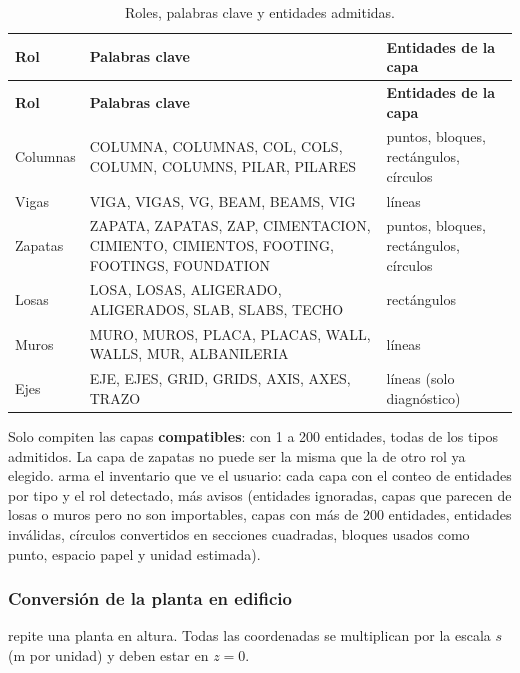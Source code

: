 \begin{longtable}{L{2.2cm}L{7cm}L{4.4cm}}
	\caption{Roles, palabras clave y entidades admitidas.} \label{tab:mod-dxf-roles} \\
	\hline
	\textbf{Rol} & \textbf{Palabras clave} & \textbf{Entidades de la capa} \\ \hline
	\endfirsthead
	\hline
	\textbf{Rol} & \textbf{Palabras clave} & \textbf{Entidades de la capa} \\ \hline
	\endhead
	\hline
	\endfoot
	Columnas & COLUMNA, COLUMNAS, COL, COLS, COLUMN, COLUMNS, PILAR, PILARES & puntos, bloques, rectángulos,
	círculos \\
	Vigas & VIGA, VIGAS, VG, BEAM, BEAMS, VIG & líneas \\
	Zapatas & ZAPATA, ZAPATAS, ZAP, CIMENTACION, CIMIENTO, CIMIENTOS, FOOTING, FOOTINGS, FOUNDATION & puntos, bloques,
	rectángulos, círculos \\
	Losas & LOSA, LOSAS, ALIGERADO, ALIGERADOS, SLAB, SLABS, TECHO & rectángulos \\
	Muros & MURO, MUROS, PLACA, PLACAS, WALL, WALLS, MUR, ALBANILERIA & líneas \\
	Ejes & EJE, EJES, GRID, GRIDS, AXIS, AXES, TRAZO & líneas (solo diagnóstico) \\
\end{longtable}

Solo compiten las capas \textbf{compatibles}: con 1 a 200 entidades, todas de los tipos admitidos. La capa de zapatas
no puede ser la misma que la de otro rol ya elegido.  arma el inventario que ve el
usuario: cada capa con el conteo de entidades por tipo y el rol detectado, más avisos (entidades ignoradas, capas que
parecen de losas o muros pero no son importables, capas con más de 200 entidades, entidades inválidas, círculos
convertidos en secciones cuadradas, bloques usados como punto, espacio papel y unidad estimada).

\subsubsection{Conversión de la planta en edificio}

 repite una planta en altura. Todas las coordenadas se multiplican por la
escala $s$ (m por unidad) y deben estar en $z = 0$.

